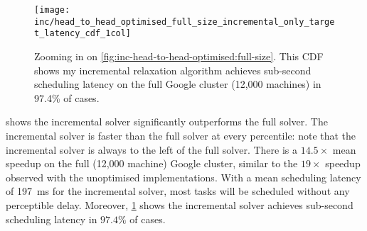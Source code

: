 %

\begin{figure}
    \texttt{[image: inc/head\_to\_head\_optimised\_full\_size\_incremental\_only\_target\_latency\_cdf\_1col]}
    \caption[Performance of my incremental algorithm on the full Google cluster]{Zooming in on \cref{fig:inc-head-to-head-optimised:full-size}. This CDF shows my incremental relaxation algorithm achieves sub-second scheduling latency on the full Google cluster (12,000 machines) in 97.4\% of cases.}
    \label{fig:inc-head-to-head-optimised-inconly}
\end{figure}

 shows the incremental solver significantly outperforms the full solver. The incremental solver is faster than the full solver at every percentile: note that the incremental solver is always to the left of the full solver. There is a $14.5\times$ mean speedup on the full (12,000 machine) Google cluster, similar to the $19\times$ speedup observed with the unoptimised implementations\footnotemark. With a mean scheduling latency of \SI{197}{\milli\second} for the incremental solver, most tasks will be scheduled without any perceptible delay. Moreover, \cref{fig:inc-head-to-head-optimised-inconly} shows the incremental solver achieves sub-second scheduling latency in $97.4\%$ of cases.

